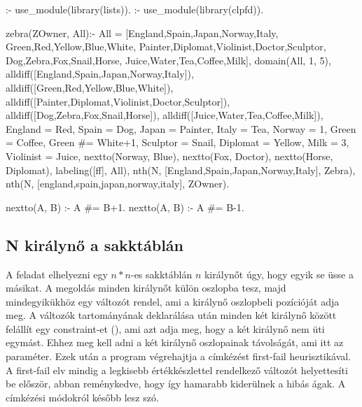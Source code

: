 \begin{prologcode}
:- use_module(library(lists)).
:- use_module(library(clpfd)).

zebra(ZOwner, All):-
  All = [England,Spain,Japan,Norway,Italy,
         Green,Red,Yellow,Blue,White,
         Painter,Diplomat,Violinist,Doctor,Sculptor,
         Dog,Zebra,Fox,Snail,Horse,
         Juice,Water,Tea,Coffee,Milk],
  domain(All, 1, 5),
  alldiff([England,Spain,Japan,Norway,Italy]),
  alldiff([Green,Red,Yellow,Blue,White]),
  alldiff([Painter,Diplomat,Violinist,Doctor,Sculptor]),
  alldiff([Dog,Zebra,Fox,Snail,Horse]),
  alldiff([Juice,Water,Tea,Coffee,Milk]),
  England = Red,          Spain = Dog,
  Japan = Painter,        Italy = Tea,
  Norway = 1,             Green = Coffee,
  Green #= White+1,       Sculptor = Snail,
  Diplomat = Yellow,      Milk = 3,
  Violinist = Juice,      nextto(Norway, Blue),
  nextto(Fox, Doctor),    nextto(Horse, Diplomat),
  labeling([ff], All),
  nth(N, [England,Spain,Japan,Norway,Italy], Zebra),
  nth(N, [england,spain,japan,norway,italy], ZOwner).

nextto(A, B) :-  A #= B+1.
nextto(A, B) :-  A #= B-1.
\end{prologcode}

\subsection{N királynő a sakktáblán}

A feladat elhelyezni egy $n * n$-es sakktáblán $n$ királynőt úgy, hogy
egyik se üsse a másikat.
\br
A megoldás minden királynőt külön oszlopba tesz, majd mindegyikükhöz
egy változót rendel, ami a királynő oszlopbeli pozícióját adja meg. A
változók tartományának deklarálása után minden két királynő között
felállít egy constraint-et (), ami azt adja meg, hogy
a két királynő nem üti egymást. Ehhez meg kell adni a két királynő
oszlopainak távolságát, ami itt az  paraméter. Ezek után a
program végrehajtja a címkézést first-fail heurisztikával. A first-fail
elv mindig a legkisebb értékkészlettel rendelkező változót helyettesíti
be először, abban reménykedve, hogy így hamarabb kiderülnek a hibás ágak.
A címkézési módokról később lesz szó.

\label{no:threat}

